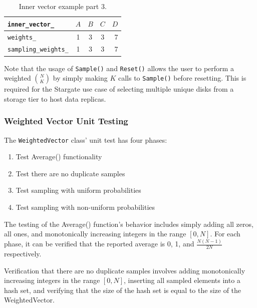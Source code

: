 \documentclass[12pt]{article}
\begin{document}
    \begin{table}[htbp]
      \caption{Inner vector example part 3.}
      \label{tbl:inner-vec-4}
      \begin{center}
      \begin{tabular}{ | l | c | c | c | r | }
        \hline
        \verb|inner_vector_| & $A$ & $B$ & $C$ & $D$ \\ \hline
        \verb|weights_| & 1 & 3 & 3 & 7 \\ \hline
        \verb|sampling_weights_| & 1 & 3 & 3 & 7 \\ \hline
        \hline
      \end{tabular}
      \end{center}
    \end{table}

    Note that the usage of \texttt{Sample()} and \texttt{Reset()} allows the
    user to perform a weighted $\binom{N}{K}$ by simply making $K$ calls to
    \texttt{Sample()} before resetting. This is required for the Stargate use
    case of selecting multiple unique disks from a storage tier to host data
    replicas.

    \FloatBarrier

    \subsubsection{Weighted Vector Unit Testing}

    The \texttt{WeightedVector} class' unit test has four phases:

    \begin{tcolorbox}
    \begin{enumerate}
      \item Test Average() functionality
      \item Test there are no duplicate samples
      \item Test sampling with uniform probabilities
      \item Test sampling with non-uniform probabilities
    \end{enumerate}
    \end{tcolorbox}

    The testing of the Average() function's behavior includes simply adding all
    zeros, all ones, and monotonically increasing integers in the range
    $[0,N]$. For each phase, it can be verified that the reported average is 0,
    1, and $\frac{N(N-1)}{2N}$ respectively.  

    Verification that there are no duplicate samples involves adding
    monotonically increasing integers in the range $[0,N]$, inserting all
    sampled elements into a hash set, and verifying that the size of the hash
    set is equal to the size of the WeightedVector.
\end{document}
